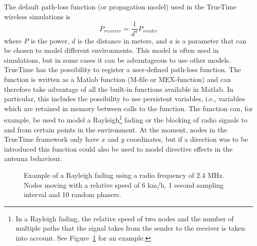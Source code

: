 \documentclass[final,twoside]{rapport}
\begin{document}
The default path-loss function (or propagation model) used in the
TrueTime wireless simulations is
\[
P_{receiver}=\frac{1}{d^a}P_{sender}
\]
where $P$ is the power, $d$ is the distance in meters, and $a$ is a
parameter that can be chosen to model different environments. This
model is often used in simulations, but in some cases it can be
advantageous to use other models. TrueTime has the possibility to
register a user-defined path-loss function. The function is written as
a Matlab function (M-file or MEX-function) and can therefore take
advantage of all the built-in functions available in Matlab. In
particular, this includes the possibility to use persistent variables,
i.e., variables which are retained in memory between calls to the
function. The function can, for example, be used to model a
Rayleigh\footnote{In a Rayleigh fading, the relative speed of two
  nodes and the number of multiple paths that the signal takes from
  the sender to the receiver is taken into account. See
  Figure~\ref{fig:rayleigh} for an example.} fading or the blocking of
radio signals to and from certain points in the environment. At the
moment, nodes in the TrueTime framework only have $x$ and $y$
coordinates, but if a direction was to be introduced this function
could also be used to model directive effects in the antenna
behaviour.

\begin{figure}
  \centerline{
  }
  \caption{Example of a Rayleigh fading using a radio frequency of 2.4 MHz.
    Nodes moving with a relative speed of 6 km/h, 1 second sampling
    interval and 10 random phasers.}
  \label{fig:rayleigh}
\end{figure}
\end{document}
